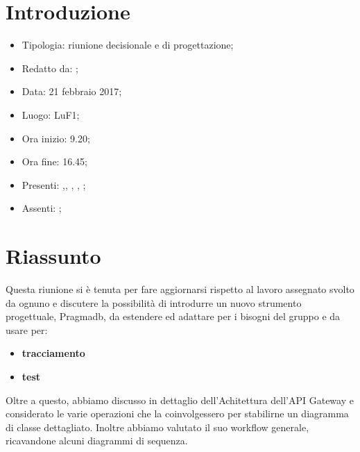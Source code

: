 \section{Introduzione}

	\begin{itemize}
		\item Tipologia: riunione decisionale e di progettazione;
		\item Redatto da: \DAN;
		\item Data: 21 febbraio 2017;
		\item Luogo: LuF1;
		\item Ora inizio: 9.20;
		\item Ora fine: 16.45;
		\item Presenti: \AS,\AN, \DS, \MC, \NS;
		\item Assenti: \DAN;	
	\end{itemize}

\section{Riassunto}
Questa riunione si è tenuta per fare aggiornarsi rispetto al lavoro assegnato svolto da ognuno e discutere la possibilit\`{a} di introdurre un nuovo strumento progettuale, Pragmadb, da estendere ed adattare per i bisogni del gruppo e da usare per:
\begin{itemize}
	\item \textbf{tracciamento}
	\item \textbf{test}
\end{itemize}

Oltre a questo, abbiamo discusso in dettaglio dell'Achitettura dell'API Gateway e considerato le varie operazioni che la coinvolgessero per stabilirne un diagramma di classe dettagliato. Inoltre abbiamo valutato il suo workflow generale, ricavandone alcuni diagrammi di sequenza. 

